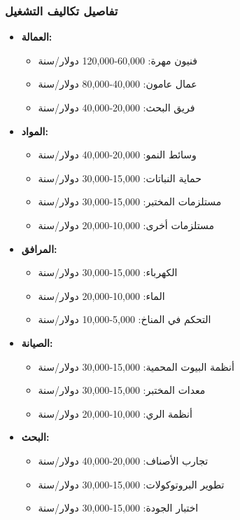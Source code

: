 \subsubsection{تفاصيل تكاليف التشغيل}
\begin{itemize}
    \item \textbf{العمالة:}
    \begin{itemize}
        \item فنيون مهرة: 60,000-120,000 دولار/سنة
        \item عمال عامون: 40,000-80,000 دولار/سنة
        \item فريق البحث: 20,000-40,000 دولار/سنة
    \end{itemize}
    
    \item \textbf{المواد:}
    \begin{itemize}
        \item وسائط النمو: 20,000-40,000 دولار/سنة
        \item حماية النباتات: 15,000-30,000 دولار/سنة
        \item مستلزمات المختبر: 15,000-30,000 دولار/سنة
        \item مستلزمات أخرى: 10,000-20,000 دولار/سنة
    \end{itemize}
    
    \item \textbf{المرافق:}
    \begin{itemize}
        \item الكهرباء: 15,000-30,000 دولار/سنة
        \item الماء: 10,000-20,000 دولار/سنة
        \item التحكم في المناخ: 5,000-10,000 دولار/سنة
    \end{itemize}
    
    \item \textbf{الصيانة:}
    \begin{itemize}
        \item أنظمة البيوت المحمية: 15,000-30,000 دولار/سنة
        \item معدات المختبر: 15,000-30,000 دولار/سنة
        \item أنظمة الري: 10,000-20,000 دولار/سنة
    \end{itemize}
    
    \item \textbf{البحث:}
    \begin{itemize}
        \item تجارب الأصناف: 20,000-40,000 دولار/سنة
        \item تطوير البروتوكولات: 15,000-30,000 دولار/سنة
        \item اختبار الجودة: 15,000-30,000 دولار/سنة
    \end{itemize}
\end{itemize}


